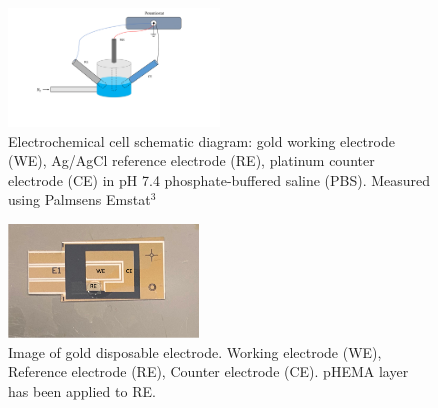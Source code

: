 \begin{figure}[H]
\centering
\includegraphics[width=0.5\textwidth]{img/james1.png}
\caption{Electrochemical cell schematic diagram: gold working electrode (WE), Ag/AgCl reference electrode (RE), platinum counter electrode (CE) in pH 7.4 phosphate-buffered saline (PBS). Measured using Palmsens Emstat$^3$}
\end{figure}

\begin{figure}[H]
\centering
\includegraphics[width=0.45\textwidth]{img/disp electrode.PNG}
\caption{Image of gold disposable electrode. Working electrode (WE), Reference electrode (RE), Counter electrode (CE). pHEMA layer has been applied to RE.}
\end{figure}


